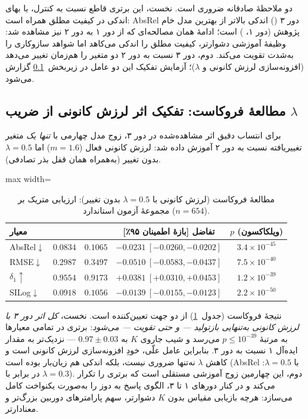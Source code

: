 دو ملاحظهٔ صادقانه ضروری است. نخست، این برتری قاطع نسبت به کنترل، با بهای اندکی در کیفیت مطلق همراه است: AbsRel \proposedmodel{} دور ۳ () اندکی بالاتر از بهترین مدل خام پژوهش (دور ۱، ) است؛ ادامهٔ همان مصالحه‌ای که از دور ۱ به دور ۲ نیز مشاهده شد: وظیفهٔ آموزشی دشوارتر، کیفیت مطلق را اندکی می‌کاهد اما شواهد سازوکاری را به‌شدت تقویت می‌کند. دوم، دور ۳ نسبت به دور ۲ دو متغیر را هم‌زمان تغییر می‌دهد (افزونه‌سازی لرزش کانونی و $\lambda$)؛ آزمایش تفکیک این دو عامل در زیربخش~\ref{subsec:focal_ablation} گزارش می‌شود.

\subsection{مطالعهٔ فروکاست: تفکیک اثر لرزش کانونی از ضریب $\lambda$}
\label{subsec:focal_ablation}

برای انتساب دقیق اثر مشاهده‌شده در دور ۳، زوج مدل چهارمی با \emph{تنها یک} متغیر تغییریافته نسبت به دور ۲ آموزش داده شد: لرزش کانونی فعال ($m=1.6$) اما $\lambda=0.5$ بدون تغییر (به‌همراه همان قفل بذر تصادفی).

\begin{table}[htbp]
\centering
\caption{مطالعهٔ فروکاست (لرزش کانونی با $\lambda=0.5$ بدون تغییر): ارزیابی متریک بر مجموعهٔ آزمون استاندارد  ($n=654$).}
\label{tab:nyu_metric_focal_ablation}
\small
\begin{adjustbox}{max width=\textwidth}
\begin{tabular}{lcccc}
\hline
معیار & \tableproposedmodel{} & \tablecontrolmodel{} & تفاضل [بازهٔ اطمینان ۹۵٪] & $p$ (ویلکاکسون) \\ \hline
AbsRel$\downarrow$ & $\mathbf{0.0834}$ & $0.1065$ & $-0.0231\ [-0.0260, -0.0202]$ & $3.4\times10^{-45}$ \\
RMSE$\downarrow$ & $\mathbf{0.2987}$ & $0.3497$ & $-0.0510\ [-0.0583, -0.0437]$ & $7.5\times10^{-40}$ \\
$\delta_1\uparrow$ & $\mathbf{0.9554}$ & $0.9173$ & $+0.0381\ [+0.0310, +0.0453]$ & $1.2\times10^{-39}$ \\
SILog$\downarrow$ & $\mathbf{0.0918}$ & $0.1056$ & $-0.0139\ [-0.0155, -0.0123]$ & $2.2\times10^{-50}$ \\ \hline
\end{tabular}
\end{adjustbox}
\end{table}

نتیجهٔ فروکاست (جدول~\ref{tab:nyu_metric_focal_ablation}) از دو جهت تعیین‌کننده است. نخست، \emph{کل اثر دور ۳ با لرزش کانونی به‌تنهایی بازتولید --- و حتی تقویت --- می‌شود}: برتری \proposedmodel{} در تمامی معیارها به مرتبهٔ $p \le 10^{-39}$ می‌رسد و شیب جاروی $K$ به $0.97 \pm 0.03$ --- نزدیک‌تر به مقدار ایده‌آل ۱ نسبت به دور ۳. بنابراین عامل علّی، خودِ افزونه‌سازی لرزش کانونی است و کاهش $\lambda$ نه‌تنها ضروری نیست، بلکه اندکی هم زیان‌بار بوده است (AbsRel \proposedmodel{} با $\lambda=0.5$:  در برابر  با $\lambda=0.3$). دوم، این چهارمین زوج آموزشی مستقلی است که برتری \proposedmodel{} را تکرار می‌کند و در کنار دورهای ۱ تا ۳، الگوی پاسخ به دوز را به‌صورت یکنواخت کامل می‌سازد: هرچه بازیابی مقیاس بدون $K$ دشوارتر، سهم پارامترهای دوربین بزرگ‌تر و معنادارتر.

